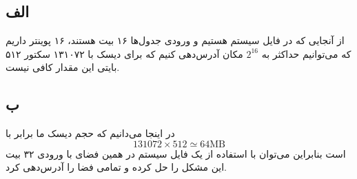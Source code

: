 \subsection*{الف}
از آنجایی که در فایل سیستم
هستیم و ورودی جدول‌ها ۱۶ بیت هستند، ۱۶ پوینتر داریم که می‌توانیم حداکثر به
$2^16$
مکان آدرس‌دهی کنیم که برای دیسک با ۱۳۱۰۷۲ سکتور ۵۱۲ بایتی این مقدار کافی نیست.


\subsection*{ب}
در اینجا می‌دانیم که حجم دیسک ما برابر با 
\[
    131072 \times 512 \simeq 64 \text{MB}
\]
است بنابراین می‌توان با استفاده از یک فایل سیستم در همین فضای
با ورودی ۳۲ بیت این مشکل را حل کرده و تمامی فضا را آدرس‌دهی کرد.

